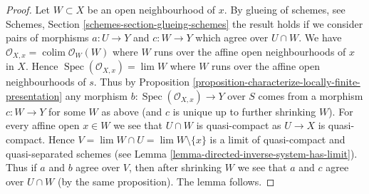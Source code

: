 \documentclass[10pt,a4paper]{amsart}
\theoremstyle{plain}
\theoremstyle{definition}
\theoremstyle{remark}
\numberwithin{equation}{subsection}
\def\lim{\mathop{\mathrm{lim}}\nolimits}
\def\colim{\mathop{\mathrm{colim}}\nolimits}
\def\Spec{\mathop{\mathrm{Spec}}}
\begin{document}
\begin{proof}
Let $W \subset X$ be an open neighbourhood of $x$. By
glueing of schemes, see
Schemes, Section \ref{schemes-section-glueing-schemes}
the result holds if we consider pairs of morphisms
$a : U \to Y$ and $c : W \to Y$ which agree over $U \cap W$.
We have $\mathcal{O}_{X, x} = \colim \mathcal{O}_W(W)$ where
$W$ runs over the affine open neighbourhoods of $x$ in $X$.
Hence $\Spec(\mathcal{O}_{X, x}) = \lim W$ where $W$
runs over the affine open neighbourhoods of $s$.
Thus by
Proposition \ref{proposition-characterize-locally-finite-presentation}
any morphism $b : \Spec(\mathcal{O}_{X, x}) \to Y$
over $S$ comes from a morphism $c : W \to Y$ for some $W$ as above
(and $c$ is unique up to further shrinking $W$).
For every affine open $x \in W$ we see that $U \cap W$
is quasi-compact as $U \to X$ is quasi-compact.
Hence $V = \lim W \cap U = \lim W \setminus \{x\}$ is a limit of
quasi-compact and quasi-separated schemes (see
Lemma \ref{lemma-directed-inverse-system-has-limit}).
Thus if $a$ and $b$ agree over $V$, then after shrinking $W$
we see that $a$ and $c$ agree over $U \cap W$ (by the same
proposition). The lemma follows.
\end{proof}
\end{document}
